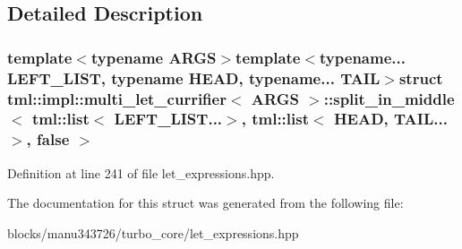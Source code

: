 \subsection{Detailed Description}
\subsubsection*{template$<$typename A\+R\+G\+S$>$template$<$typename... L\+E\+F\+T\+\_\+\+L\+I\+S\+T, typename H\+E\+A\+D, typename... T\+A\+I\+L$>$struct tml\+::impl\+::multi\+\_\+let\+\_\+currifier$<$ A\+R\+G\+S $>$\+::split\+\_\+in\+\_\+middle$<$ tml\+::list$<$ L\+E\+F\+T\+\_\+\+L\+I\+S\+T...$>$, tml\+::list$<$ H\+E\+A\+D, T\+A\+I\+L...$>$, false $>$}



Definition at line 241 of file let\+\_\+expressions.\+hpp.



The documentation for this struct was generated from the following file\+:\begin{DoxyCompactItemize}
\item 
blocks/manu343726/turbo\+\_\+core/let\+\_\+expressions.\+hpp\end{DoxyCompactItemize}
